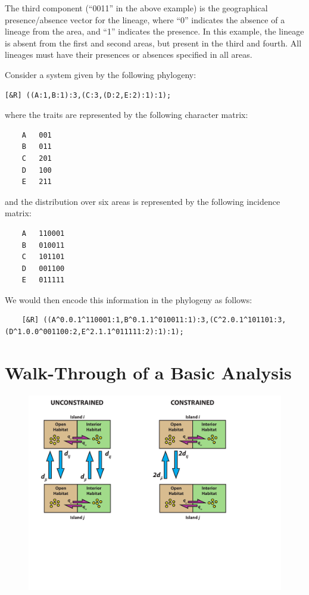 \documentclass[11pt,openany]{memoir} %
\begin{document}
The third component (``0011'' in the above example) is the geographical presence/absence vector for the lineage, where ``0'' indicates the absence of a lineage from the area, and ``1'' indicates the presence.
In this example, the lineage is absent from the first and second areas, but present in the third and fourth. All lineages must have their presences or absences specified in all areas.

Consider a system given by the following phylogeny:
\begin{lstlisting}
[&R] ((A:1,B:1):3,(C:3,(D:2,E:2):1):1);
\end{lstlisting}
where the traits are represented by the following character matrix:
\begin{lstlisting}
    A   001
    B   011
    C   201
    D   100
    E   211
\end{lstlisting}
and the distribution over six areas is represented by the following incidence matrix:
\begin{lstlisting}
    A   110001
    B   010011
    C   101101
    D   001100
    E   011111
\end{lstlisting}
We would then encode this information in the phylogeny as follows:
\begin{lstlisting}
    [&R] ((A^0.0.1^110001:1,B^0.1.1^010011:1):3,(C^2.0.1^101101:3,(D^1.0.0^001100:2,E^2.1.1^011111:2):1):1);
\end{lstlisting}

\chapter{Walk-Through of a Basic Analysis}

\begin{figure}
  \vspace{-20pt}
    \begin{center}
        \includegraphics[scale=0.30]{figs/Experimental-Design-1.pdf}
    \end{center}
  \vspace{-80pt}
\end{figure}
\end{document}
